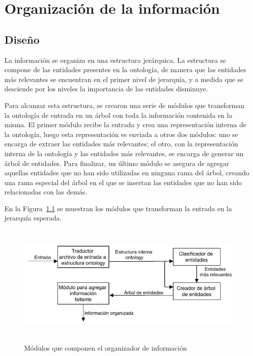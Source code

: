 \chapter{Organización de la información}

\section{Diseño}
La información se organiza en una estructura  jerárquica. La estructura se compone de las entidades presentes en la ontología, de manera que las entidades más relevantes se encuentran en el primer nivel de jerarquía, y a medida que se desciende por los niveles la importancia de las entidades disminuye.

Para alcanzar esta estructura, se crearon una serie de módulos que transforman la ontología de entrada en un árbol con toda la información contenida en la misma. El primer módulo recibe la entrada y crea una representación interna de la ontología, luego esta representación es enviada a otros dos módulos: uno se encarga de extraer las entidades más relevantes; el otro, con la representación interna de la ontología y las entidades más relevantes, se encarga de generar un árbol de entidades. Para finalizar, un último módulo se asegura de agregar aquellas entidades que no han sido utilizadas en ninguna rama del árbol, creando una rama especial del árbol en el que se insertan las entidades que no han sido relacionadas con las demás.

En la Figura~\ref{fig:modulos_organizador_inf} se muestran los módulos que transforman la entrada en la jerarquía esperada.

\begin{figure}[H]
    \centering
    \includegraphics[width=12cm, height=6cm]{img/organizacion_informacion/modulos_organizador_de_informacion.pdf}
    \caption{Módulos que componen el organizador de información}
    \label{fig:modulos_organizador_inf}
\end{figure}


